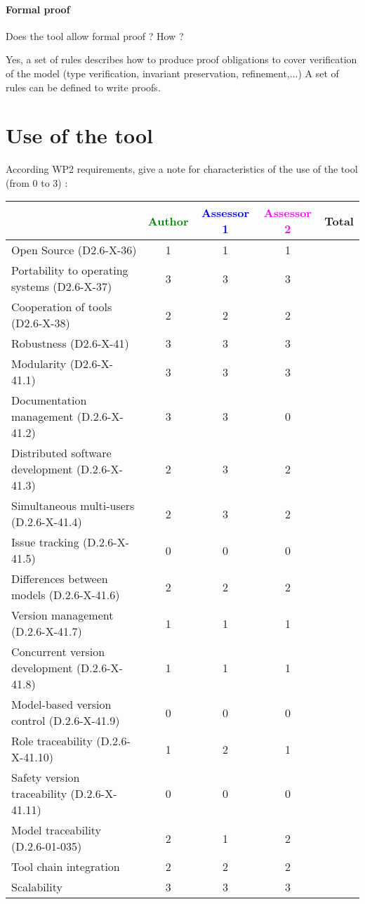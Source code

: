 \paragraph{Formal proof}
Does the tool allow formal proof ?  How ?

\begin{author_comment}
Yes, a set of rules describes how to  produce proof obligations to cover verification of the model (type verification, invariant preservation, refinement,...)
A set of rules can be defined to  write proofs.  
\end{author_comment}

\section{Use of the tool}


According WP2 requirements, give a note for characteristics of the use of the tool (from 0 to 3) :

\begin{tabular}{|l | c | c | c | c|}
\hline
& \textcolor{green}{Author} & \textcolor{blue}{Assessor 1} & \textcolor{magenta}{Assessor 2} & Total \\
\hline 
Open Source (D2.6-X-36) & 1 & 1 & 1 &  \\
\hline 
Portability to operating systems (D2.6-X-37) & 3 & 3 & 3 &  \\
\hline
Cooperation of tools (D2.6-X-38) & 2 & 2 & 2 &  \\
\hline
Robustness (D2.6-X-41) & 3 & 3 & 3 & \\
\hline
Modularity (D2.6-X-41.1) & 3 & 3 & 3 & \\
\hline
Documentation management (D.2.6-X-41.2) & 3 & 3 & 0 & \\
\hline
Distributed software development (D.2.6-X-41.3)  & 2 & 3 & 2 & \\
\hline
Simultaneous multi-users (D.2.6-X-41.4)   & 2 & 3 & 2 & \\
\hline
Issue tracking (D.2.6-X-41.5) & 0 & 0 & 0 & \\
\hline
Differences between models (D.2.6-X-41.6) & 2 & 2 & 2 & \\
\hline
Version management (D.2.6-X-41.7) & 1 & 1 & 1 & \\
\hline
Concurrent version development (D.2.6-X-41.8) & 1 & 1 & 1 & \\
\hline
Model-based version control (D.2.6-X-41.9) & 0 & 0 & 0 & \\
\hline
Role traceability (D.2.6-X-41.10) & 1 & 2 & 1 & \\
\hline
Safety version traceability (D.2.6-X-41.11) & 0 & 0 & 0 & \\
\hline
Model traceability (D.2.6-01-035) & 2 & 1 & 2 & \\
\hline
Tool chain integration & 2 & 2 & 2 & \\
\hline
Scalability & 3 & 3 & 3& \\
\hline
\end{tabular}

